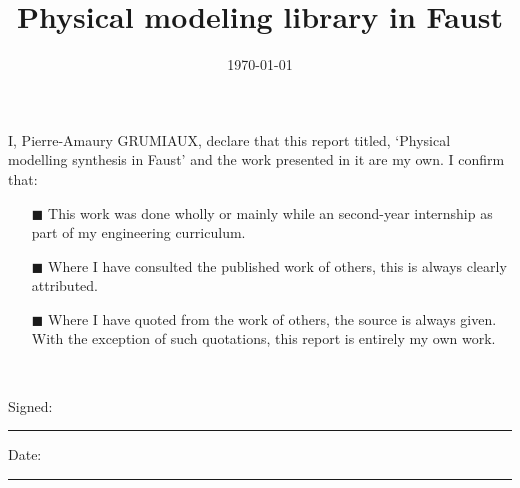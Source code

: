 \documentclass[a4paper, 11pt, oneside]{Thesis}  %
\begin{document}
\frontmatter      %

\title  {Physical modeling library in Faust}
\addresses  {\groupname\\\deptname\\\univname}  %
\date       {\today}
\subject    {}
\keywords   {}

\maketitle


\fancyhead{}  %
\rhead{\thepage}  %
\lhead{}  %

\pagestyle{fancy}  %

\Declaration
{

	I, Pierre-Amaury GRUMIAUX, declare that this report titled, `Physical modelling synthesis in Faust' and the work presented in it are my own. I confirm that:

	\begin{itemize} 
	\item[\tiny{$\blacksquare$}] This work was done wholly or mainly while an second-year internship as part of my engineering curriculum.
 
	\item[\tiny{$\blacksquare$}] Where I have consulted the published work of others, this is always clearly attributed.
 
	\item[\tiny{$\blacksquare$}] Where I have quoted from the work of others, the source is always given. With the exception of such quotations, this report is entirely my own work.
 
	\\
	\end{itemize}
 
 
	Signed:\\
	\rule[1em]{25em}{0.5pt}  %
 
	Date:\\
	\rule[1em]{25em}{0.5pt}  %
}
\clearpage  %
\end{document}
